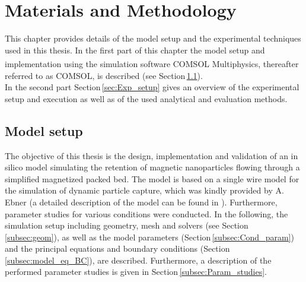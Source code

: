 % 
% 


\chapter{Materials and Methodology}
\label{chap:chap_mat}

This chapter provides details of the model setup and the experimental techniques used in this thesis. In the first part of this chapter the model setup and implementation using the simulation software COMSOL Multiphysics\textsuperscript{\textregistered}, thereafter referred to as COMSOL, is described (see Section\,\ref{sec:Model_setup}).\\
In the second part Section\,\ref{sec:Exp_setup} gives an overview of the experimental setup and execution as well as of the used analytical and evaluation methods.  

\section{Model setup}
\label{sec:Model_setup}
The objective of this thesis is the design, implementation and validation of an in silico model simulating the retention of magnetic nanoparticles flowing through a simplified magnetized packed bed. The model is based on a single wire model for the simulation of dynamic particle capture, which was kindly provided by A. Ebner (a detailed description of the model can be found in \cite{choomphon2017simulation}). Furthermore, parameter studies for various conditions were conducted. In the following, the simulation setup including geometry, mesh and solvers (see Section\,\ref{subsec:geom}), as well as the model parameters (Section\,\ref{subsec:Cond_param}) and the principal equations and boundary conditions (Section\,\ref{subsec:model_eq_BC}), are described. Furthermore, a description of the performed parameter studies is given in Section\,\ref{subsec:Param_studies}.     

